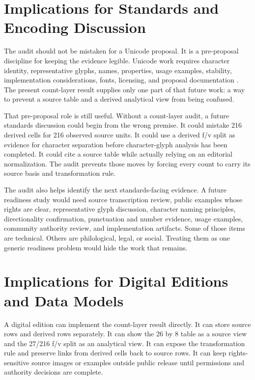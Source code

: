 \documentclass[sigconf,nonacm]{acmart}
\begin{document}
\section{Implications for Standards and Encoding Discussion}
The audit should not be mistaken for a Unicode proposal. It is a pre-proposal
discipline for keeping the evidence legible. Unicode work requires character
identity, representative glyphs, names, properties, usage examples, stability,
implementation considerations, fonts, licensing, and proposal documentation
\cite{unicode17CoreSpec,unicodeProposals,unicodeRoadmaps,unicodePipeline2026,seiProposalTips}.
The present count-layer result supplies only one part of that future work: a
way to prevent a source table and a derived analytical view from being
confused.

That pre-proposal role is still useful. Without a count-layer audit, a future
standards discussion could begin from the wrong premise. It could mistake 216
derived cells for 216 observed source units. It could use a derived f/v split as
evidence for character separation before character-glyph analysis has been
completed. It could cite a source table while actually relying on an editorial
normalization. The audit prevents those moves by forcing every count to carry
its source basis and transformation rule.

The audit also helps identify the next standards-facing evidence. A future
readiness study would need source transcription review, public examples whose
rights are clear, representative glyph discussion, character naming principles,
directionality confirmation, punctuation and number evidence, usage examples,
community authority review, and implementation artifacts. Some of those items
are technical. Others are philological, legal, or social. Treating them as one
generic readiness problem would hide the work that remains.

\section{Implications for Digital Editions and Data Models}
A digital edition can implement the count-layer result directly. It can store
source rows and derived rows separately. It can show the 26 by 8 table as a
source view and the 27/216 f/v split as an analytical view. It can expose the
transformation rule and preserve links from derived cells back to source rows.
It can keep rights-sensitive source images or examples outside public release
until permissions and authority decisions are complete.
\end{document}
